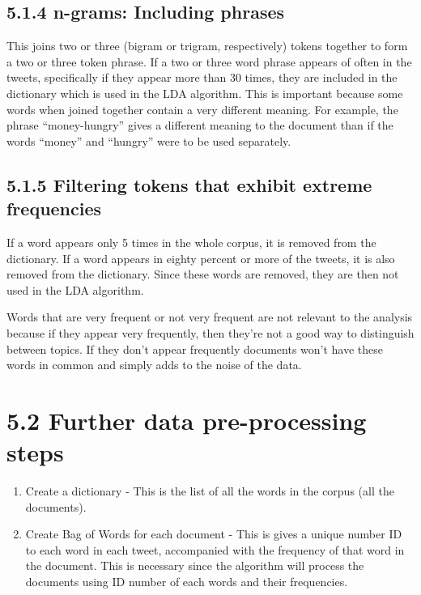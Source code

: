 \documentclass[
]{article}
\providecommand{\tightlist}{%
  \setlength{\itemsep}{0pt}\setlength{\parskip}{0pt}}
\begin{document}
\hypertarget{n-grams-including-phrases}{%
\subsection{5.1.4 n-grams: Including
phrases}\label{n-grams-including-phrases}}

This joins two or three (bigram or trigram, respectively) tokens
together to form a two or three token phrase. If a two or three word
phrase appears of often in the tweets, specifically if they appear more
than 30 times, they are included in the dictionary which is used in the
LDA algorithm. This is important because some words when joined together
contain a very different meaning. For example, the phrase
``money-hungry'' gives a different meaning to the document than if the
words ``money'' and ``hungry'' were to be used separately.

\hypertarget{filtering-tokens-that-exhibit-extreme-frequencies}{%
\subsection{5.1.5 Filtering tokens that exhibit extreme
frequencies}\label{filtering-tokens-that-exhibit-extreme-frequencies}}

If a word appears only 5 times in the whole corpus, it is removed from
the dictionary. If a word appears in eighty percent or more of the
tweets, it is also removed from the dictionary. Since these words are
removed, they are then not used in the LDA algorithm.

Words that are very frequent or not very frequent are not relevant to
the analysis because if they appear very frequently, then they're not a
good way to distinguish between topics. If they don't appear frequently
documents won't have these words in common and simply adds to the noise
of the data.

\hypertarget{further-data-pre-processing-steps}{%
\section{5.2 Further data pre-processing
steps}\label{further-data-pre-processing-steps}}

\begin{enumerate}
\def\labelenumi{\arabic{enumi}.}
\tightlist
\item
  Create a dictionary - This is the list of all the words in the corpus
  (all the documents).
\item
  Create Bag of Words for each document - This is gives a unique number
  ID to each word in each tweet, accompanied with the frequency of that
  word in the document. This is necessary since the algorithm will
  process the documents using ID number of each words and their
  frequencies.
\end{enumerate}
\end{document}
